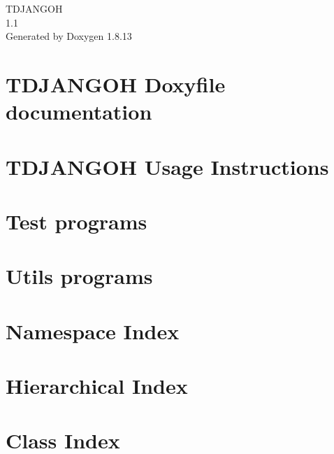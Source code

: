 \documentclass[twoside]{book}
\newcommand{\+}{\discretionary{\mbox{\scriptsize$\hookleftarrow$}}{}{}}
\newcommand{\clearemptydoublepage}{%
  \newpage{\pagestyle{empty}\cleardoublepage}%
}
\begin{document}
\hypersetup{pageanchor=false,
             bookmarksnumbered=true,
             pdfencoding=unicode
            }
\begin{titlepage}
\vspace*{7cm}
\begin{center}%
{\Large T\+D\+J\+A\+N\+G\+OH \\[1ex]\large 1.\+1 }\\
\vspace*{1cm}
{\large Generated by Doxygen 1.8.13}\\
\end{center}
\end{titlepage}
\clearemptydoublepage
{}
\tableofcontents
\clearemptydoublepage
{}
\hypersetup{pageanchor=true}

\chapter{T\+D\+J\+A\+N\+G\+OH Doxyfile documentation}
\label{index}\hypertarget{index}{}
\chapter{T\+D\+J\+A\+N\+G\+OH Usage Instructions}
\label{md__r_e_a_d_m_e}

\chapter{Test programs}
\label{md_test__t_e_s_t_p_r_o_g_r_a_m_s}

\chapter{Utils programs}
\label{md_utils__u_t_i_l_s_p_r_o_g_r_a_m_s}

\chapter{Namespace Index}

\chapter{Hierarchical Index}

\chapter{Class Index}

\end{document}
